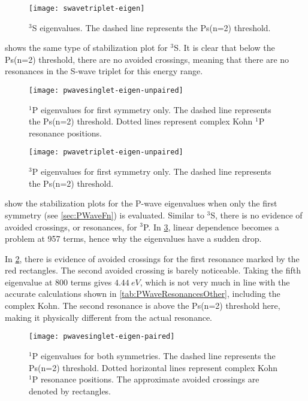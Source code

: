 \documentclass[Dissertation.tex]{subfiles}
\begin{document}
\begin{figure}[H]
	\centering
	\texttt{[image: swavetriplet-eigen]}
	\caption[$^3$S eigenvalues]{$^3$S eigenvalues. The dashed line represents the Ps(n=2) threshold.}
	\label{fig:swavetriplet-eigen}
\end{figure}

 shows the same type of stabilization plot for $^3$S. It is clear that below the Ps(n=2) threshold, there are no avoided crossings, meaning that there are no resonances in the S-wave triplet for this energy range. 

\begin{figure}[H]
	\centering
	\texttt{[image: pwavesinglet-eigen-unpaired]}
	\caption[$^1$P eigenvalues for first symmetry only]{$^1$P eigenvalues for first symmetry only. The dashed line represents the Ps(n=2) threshold. Dotted lines represent complex Kohn $^1$P resonance positions.}
	\label{fig:pwavesinglet-eigen-unpaired}
\end{figure}

\begin{figure}[H]
	\centering
	\texttt{[image: pwavetriplet-eigen-unpaired]}
	\caption[$^3$P eigenvalues for first symmetry only]{$^3$P eigenvalues for first symmetry only. The dashed line represents the Ps(n=2) threshold.}
	\label{fig:pwavetriplet-eigen-unpaired}
\end{figure}

 show the stabilization plots for the P-wave eigenvalues when only the first symmetry (see \cref{sec:PWaveFn}) is evaluated. Similar to $^3$S, there is no evidence of avoided crossings, or resonances, for $^3$P. In \cref{fig:pwavetriplet-eigen-unpaired}, linear dependence becomes a problem at 957 terms, hence why the eigenvalues have a sudden drop.

In \cref{fig:pwavesinglet-eigen-unpaired}, there is evidence of avoided crossings for the first resonance marked by the red rectangles. The second avoided crossing is barely noticeable. Taking the fifth eigenvalue at 800 terms gives $\SI{4.44}{eV}$, which is not very much in line with the accurate calculations shown in \cref{tab:PWaveResonancesOther}, including the complex Kohn. The second resonance is above the Ps(n=2) threshold here, making it physically different from the actual resonance.

\begin{figure}[H]
	\centering
	\texttt{[image: pwavesinglet-eigen-paired]}
	\caption[$^1$P eigenvalues for both symmetries]{$^1$P eigenvalues for both symmetries. The dashed line represents the Ps(n=2) threshold. Dotted horizontal lines represent complex Kohn $^1$P resonance positions. The approximate avoided crossings are denoted by rectangles.}
	\label{fig:pwavesinglet-eigen-paired}
\end{figure}
\end{document}
